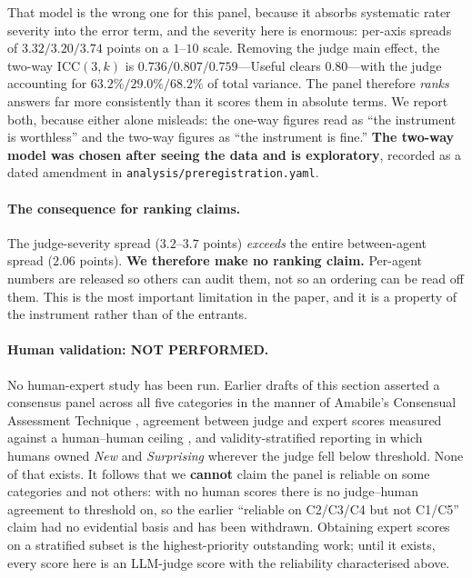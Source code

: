 That model is the wrong one for this panel, because it absorbs systematic rater severity into the error term, and the severity here is enormous: per-axis spreads of $3.32 / 3.20 / 3.74$ points on a $1$--$10$ scale. Removing the judge main effect, the two-way $\mathrm{ICC}(3,k)$ is $0.736 / 0.807 / 0.759$---Useful clears $0.80$---with the judge accounting for $63.2\% / 29.0\% / 68.2\%$ of total variance. The panel therefore \emph{ranks} answers far more consistently than it scores them in absolute terms. We report both, because either alone misleads: the one-way figures read as ``the instrument is worthless'' and the two-way figures as ``the instrument is fine.'' \textbf{The two-way model was chosen after seeing the data and is exploratory}, recorded as a dated amendment in \texttt{analysis/preregistration.yaml}.

\paragraph{The consequence for ranking claims.} The judge-severity spread ($3.2$--$3.7$ points) \emph{exceeds} the entire between-agent spread ($2.06$ points). \textbf{We therefore make no ranking claim.} Per-agent numbers are released so others can audit them, not so an ordering can be read off them. This is the most important limitation in the paper, and it is a property of the instrument rather than of the entrants.

\paragraph{Human validation: NOT PERFORMED.} No human-expert study has been run. Earlier drafts of this section asserted a consensus panel across all five categories in the manner of Amabile's Consensual Assessment Technique \citep{amabile1982cat}, agreement between judge and expert scores measured against a human--human ceiling \citep{zheng2023mtbench}, and validity-stratified reporting in which humans owned \emph{New} and \emph{Surprising} wherever the judge fell below threshold. None of that exists. It follows that we \textbf{cannot} claim the panel is reliable on some categories and not others: with no human scores there is no judge--human agreement to threshold on, so the earlier ``reliable on C2/C3/C4 but not C1/C5'' claim had no evidential basis and has been withdrawn. Obtaining expert scores on a stratified subset is the highest-priority outstanding work; until it exists, every score here is an LLM-judge score with the reliability characterised above.

